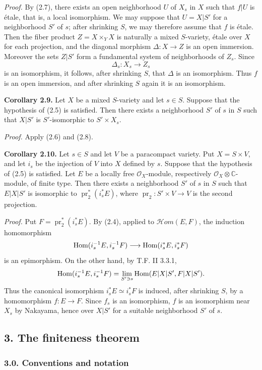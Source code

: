 \documentclass[11pt]{article}
\begin{document}
\emph{Proof.} By (2.7), there exists an open neighborhood $U$ of $X_s$ in $X$ such that $f|U$ is étale, that is, a local isomorphism. We may suppose that $U=X|S'$ for a neighborhood $S'$ of $s$; after shrinking $S$, we may therefore assume that $f$ is étale. Then the fiber product $Z=X\times_YX$ is naturally a mixed $S$-variety, étale over $X$ for each projection, and the diagonal morphism $\Delta:X\to Z$ is an open immersion. Moreover the sets $Z|S'$ form a fundamental system of neighborhoods of $Z_s$. Since
\[
 \Delta_s:X_s\longrightarrow Z_s
\]
is an isomorphism, it follows, after shrinking $S$, that $\Delta$ is an isomorphism. Thus $f$ is an open immersion, and after shrinking $S$ again it is an isomorphism.

\textbf{Corollary 2.9.} Let $X$ be a mixed $S$-variety and let $s\in S$. Suppose that the hypothesis of (2.5) is satisfied. Then there exists a neighborhood $S'$ of $s$ in $S$ such that $X|S'$ is $S'$-isomorphic to $S'\times X_s$.

\emph{Proof.} Apply (2.6) and (2.8).

\textbf{Corollary 2.10.} Let $s\in S$ and let $V$ be a paracompact variety. Put $X=S\times V$, and let $i_s$ be the injection of $V$ into $X$ defined by $s$. Suppose that the hypothesis of (2.5) is satisfied. Let $E$ be a locally free $\mathcal O_X$-module, respectively $\mathcal O_X\otimes\mathbb C$-module, of finite type. Then there exists a neighborhood $S'$ of $s$ in $S$ such that $E|X|S'$ is isomorphic to $\operatorname{pr}_2^*(i_s^*E)$, where $\operatorname{pr}_2:S'\times V\to V$ is the second projection.

\emph{Proof.} Put $F=\operatorname{pr}_2^*(i_s^*E)$. By (2.4), applied to $\mathcal Hom(E,F)$, the induction homomorphism
\[
 \operatorname{Hom}(i_s^{-1}E,i_s^{-1}F)\longrightarrow \operatorname{Hom}(i_s^*E,i_s^*F)
\]
is an epimorphism. On the other hand, by T.F. II 3.3.1,
\[
 \operatorname{Hom}(i_s^{-1}E,i_s^{-1}F)
 =\operatorname*{lim}_{S'\ni s}\operatorname{Hom}(E|X|S',F|X|S') .
\]
Thus the canonical isomorphism $i_s^*E\simeq i_s^*F$ is induced, after shrinking $S$, by a homomorphism $f:E\to F$. Since $f_s$ is an isomorphism, $f$ is an isomorphism near $X_s$ by Nakayama, hence over $X|S'$ for a suitable neighborhood $S'$ of $s$.

\subsection*{3. The finiteness theorem}

\subsubsection*{3.0. Conventions and notation}
\end{document}
